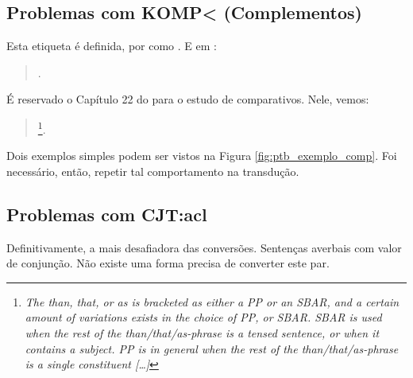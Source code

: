 \subsection{Problemas com KOMP< (Complementos)}
\label{subsec:tag_komp}
Esta etiqueta é definida, por \cite[p~57]{afonso2006arvores} como . E em \cite[p~116]{afonso2006arvores}:
\begin{quote}
    .
\end{quote}

É reservado o Capítulo 22 do \cite[p~284]{bracketing_ptb} para o estudo de comparativos. Nele, vemos:
\begin{quote}
    \footnote{\textit{The than, that, or as is bracketed as either a PP or an SBAR, and a certain amount of variations exists in the choice of PP, or SBAR. SBAR is used when the rest of the than/that/as-phrase is a tensed sentence, or when it contains a subject. PP is in general when the rest of the than/that/as-phrase is a single constituent [\ldots]}}.
\end{quote}

Dois exemplos simples podem ser vistos na Figura \ref{fig:ptb_exemplo_comp}. Foi necessário, então, repetir tal comportamento na transdução.
\begin{center}
    
\end{center}
\subsection{Problemas com CJT:acl}
\label{subsec:CJT_acl}
Definitivamente, a mais desafiadora das conversões. Sentenças averbais com valor de conjunção. Não existe uma forma precisa de converter este par. 

